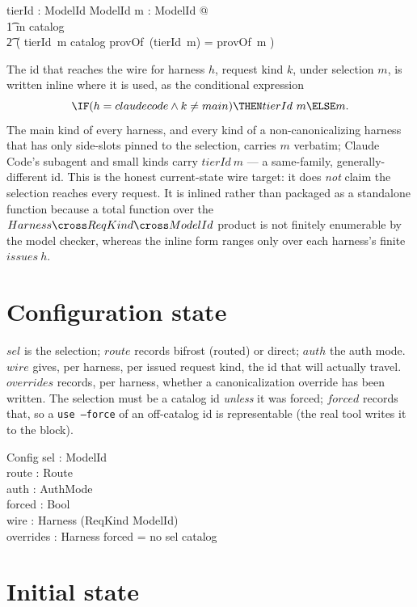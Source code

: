 \documentclass{article}
\begin{document}
\begin{axdef}
  tierId : ModelId \fun ModelId
\where
  \forall m : ModelId @ \\
  \t1 m \in catalog \implies \\
  \t2 ( tierId~m \in catalog \land provOf~(tierId~m) = provOf~m )
\end{axdef}

The id that reaches the wire for harness $h$, request kind $k$, under selection
$m$, is written inline where it is used, as the conditional expression
\[ \IF (h = claudecode \land k \neq main) \THEN tierId~m \ELSE m. \]
The main kind of every harness, and every kind of a non-canonicalizing harness
that has only side-slots pinned to the selection, carries $m$ verbatim; Claude
Code's subagent and small kinds carry $tierId~m$ --- a same-family,
generally-different id. This is the honest current-state wire target: it does
\emph{not} claim the selection reaches every request. It is inlined rather than
packaged as a standalone function because a total function over the
$Harness \cross ReqKind \cross ModelId$ product is not finitely enumerable by
the model checker, whereas the inline form ranges only over each harness's
finite $issues~h$.

\section{Configuration state}

$sel$ is the selection; $route$ records bifrost (routed) or direct; $auth$ the
auth mode. $wire$ gives, per harness, per issued request kind, the id that will
actually travel. $overrides$ records, per harness, whether a canonicalization
override has been written. The selection must be a catalog id \emph{unless} it
was forced; $forced$ records that, so a \texttt{use --force} of an off-catalog
id is representable (the real tool writes it to the block).

\begin{schema}{Config}
  sel : ModelId \\
  route : Route \\
  auth : AuthMode \\
  forced : Bool \\
  wire : Harness \pfun (ReqKind \pfun ModelId) \\
  overrides : \power Harness
\where
  forced = no \implies sel \in catalog
\end{schema}

\section{Initial state}
\end{document}
